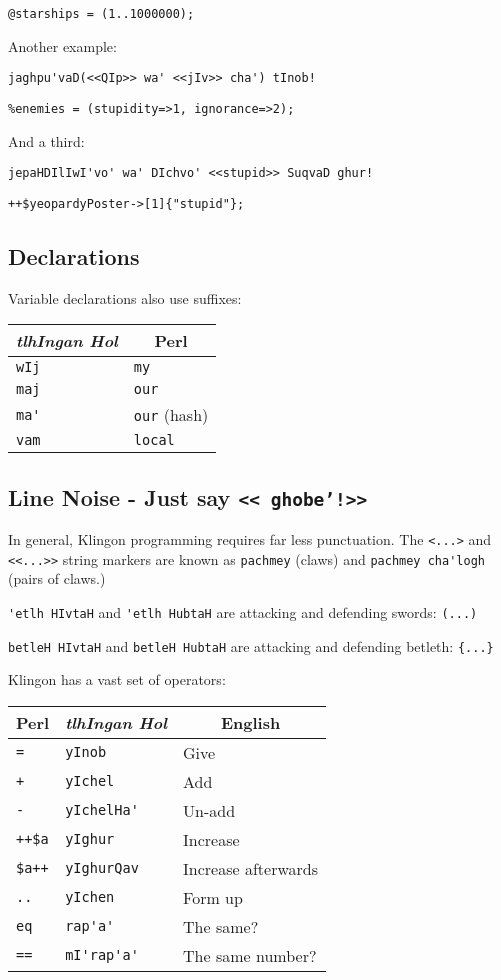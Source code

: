 \documentclass{article}
\begin{document}
\verb"@starships = (1..1000000);"

\noindent Another example:

\verb"jaghpu'vaD(<<QIp>> wa' <<jIv>> cha') tInob!"

\verb'%enemies = (stupidity=>1, ignorance=>2);'

\noindent And a third:

\verb"jepaHDIlIwI'vo' wa' DIchvo' <<stupid>> SuqvaD ghur!"

\verb'++$yeopardyPoster->[1]{"stupid"};'

\subsection{Declarations}
Variable declarations also use suffixes:

\begin{center}
\begin{tabular}{l|l}
\multicolumn{1}{c|}{\it tlhIngan Hol} & \multicolumn{1}{c}{Perl}\\\hline
\verb"wIj" & \verb'my'\\
\verb"maj" & \verb'our'\\
\verb"ma'" & \verb'our' (hash)\\
\verb"vam" & \verb'local'\\
\end{tabular}
\end{center}

\subsection{Line Noise - Just say \texttt{\textless\textless 
ghobe'!\textgreater\textgreater}}
In general, Klingon programming requires far less punctuation.
The \verb'<...>'
and \verb'<<...>>' string markers are known as \verb'pachmey' (claws)
and \verb"pachmey cha'logh" (pairs of claws.)

\verb"'etlh HIvtaH" and \verb"'etlh HubtaH" are attacking and 
defending swords: \verb'(...)'

\verb"betleH HIvtaH" and \verb"betleH HubtaH" are attacking and defending 
betleth: \verb'{...}'

Klingon has a vast set of operators:
\begin{center}
\begin{tabular}{l|l|l}
\multicolumn{1}{c|}{Perl} & \multicolumn{1}{c|}{\it tlhIngan Hol}
& \multicolumn{1}{c}{English}\\\hline
\verb"=" & \verb"yInob" & Give\\
\verb"+" & \verb"yIchel" & Add\\
\verb"-" & \verb"yIchelHa'" & Un-add\\
\verb"++$a" & \verb"yIghur" & Increase\\
\verb"$a++" & \verb"yIghurQav" & Increase afterwards\\
\verb".." & \verb"yIchen" & Form up\\
\verb"eq" & \verb"rap'a'" & The same?\\
\verb"==" & \verb"mI'rap'a'" & The same number?\\
\end{tabular}
\end{center}
\end{document}
